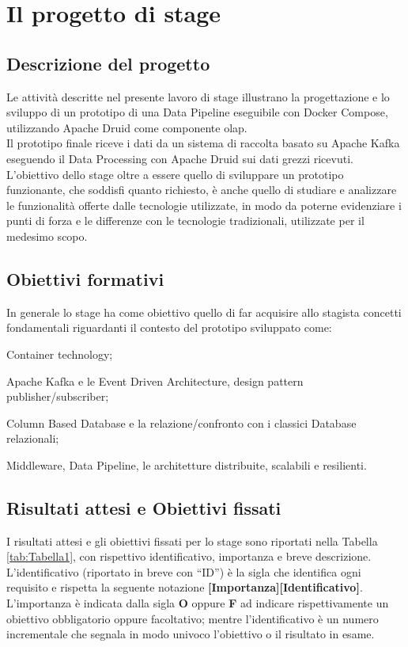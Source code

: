\section{Il progetto di stage}
\subsection{Descrizione del progetto}
Le attività descritte nel presente lavoro di stage illustrano la progettazione e lo sviluppo di un prototipo di una \gls{Data Pipeline}{} eseguibile
con Docker Compose, utilizzando Apache Druid come componente \gls{olap}{}.\\
Il prototipo finale riceve i dati da un sistema di raccolta basato su Apache Kafka eseguendo il \gls{Data Processing}{} con Apache Druid sui dati grezzi ricevuti.\\
L'obiettivo dello stage oltre a essere quello di sviluppare un prototipo funzionante, che soddisfi quanto richiesto, è anche quello di studiare e analizzare le funzionalità offerte dalle tecnologie utilizzate, in modo da poterne evidenziare i punti di forza e 
le differenze con le tecnologie tradizionali, utilizzate per il medesimo scopo. \\
\subsection{Obiettivi formativi}
In generale lo stage ha come obiettivo quello di far acquisire allo stagista concetti fondamentali riguardanti il contesto del prototipo sviluppato come: 
\begin{list}{*}{}
    \item Container technology;
    \item Apache Kafka e le Event Driven Architecture, design pattern publisher/subscriber;
    \item Column Based Database e la relazione/confronto con i classici Database relazionali;
    \item \gls{Middleware}{}, \gls{Data Pipeline}{}, le architetture distribuite, scalabili e resilienti.
\end{list}
\subsection{Risultati attesi e Obiettivi fissati}
I risultati attesi e gli obiettivi fissati per lo stage sono riportati nella Tabella \ref{tab:Tabella1}, con rispettivo identificativo, importanza e breve descrizione.
\\L'identificativo (riportato in breve con “ID”) è la sigla che identifica ogni requisito e rispetta la seguente notazione \textbf{[Importanza][Identificativo]}. \\
L’importanza è indicata dalla sigla \textbf{O} oppure \textbf{F} ad indicare rispettivamente un obiettivo
obbligatorio oppure facoltativo; mentre l’identificativo è un numero incrementale che
segnala in modo univoco l’obiettivo o il risultato in esame.\\

